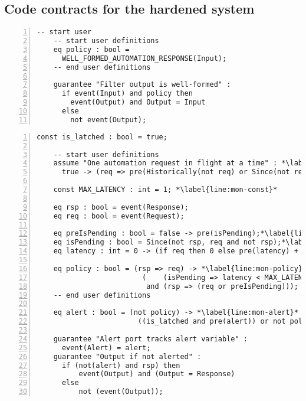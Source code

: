 \subsection{Code contracts for the hardened system}
\label{sec:ha-contracts}

\newsavebox{\flt}
\begin{lrbox}{\flt}
  \begin{lstlisting}[style=agree,numbers=left] -- start user
    -- start user definitions
    eq policy : bool =
      WELL_FORMED_AUTOMATION_RESPONSE(Input);
    -- end user definitions

    guarantee "Filter output is well-formed" :
      if event(Input) and policy then
        event(Output) and Output = Input
      else
        not event(Output);
  \end{lstlisting}
\end{lrbox}

\newsavebox{\mntr}
\begin{lrbox}{\mntr}
  \begin{lstlisting}[style=agree,numbers=left]
    const is_latched : bool = true;

    -- start user definitions
    assume "One automation request in flight at a time" : *\label{line:mon-assume}*
      true -> (req => pre(Historically(not req) or Since(not req, rsp)));

    const MAX_LATENCY : int = 1; *\label{line:mon-const}*

    eq rsp : bool = event(Response);
    eq req : bool = event(Request);

    eq preIsPending : bool = false -> pre(isPending);*\label{line:mon-pre-pending}*
    eq isPending : bool = Since(not rsp, req and not rsp);*\label{line:mon-pending}*
    eq latency : int = 0 -> (if req then 0 else pre(latency) + 1);*\label{line:mon-latency}*

    eq policy : bool = (rsp => req) -> *\label{line:mon-policy}*
                         (    (isPending => latency < MAX_LATENCY)
                          and (rsp => (req or preIsPending)));
    -- end user definitions

    eq alert : bool = (not policy) -> *\label{line:mon-alert}*
                        ((is_latched and pre(alert)) or not policy);

    guarantee "Alert port tracks alert variable" :
      event(Alert) = alert;
    guarantee "Output if not alerted" :
      if (not(alert) and rsp) then
          event(Output) and (Output = Response)
      else
          not (event(Output));
  \end{lstlisting}
\end{lrbox}

